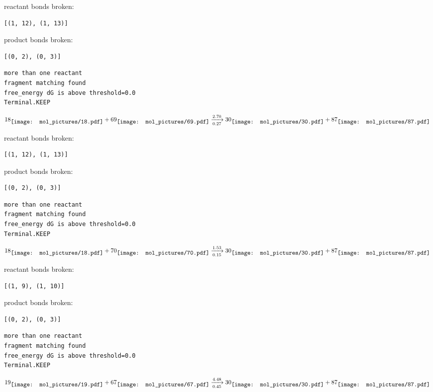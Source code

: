 \documentclass{article}
\begin{document}
reactant bonds broken:\begin{verbatim}
[(1, 12), (1, 13)]
\end{verbatim}
product bonds broken:\begin{verbatim}
[(0, 2), (0, 3)]
\end{verbatim}




\vspace{1cm}
\begin{verbatim}
more than one reactant
fragment matching found
free_energy dG is above threshold=0.0
Terminal.KEEP
\end{verbatim}
$$
18
\raisebox{-.5\height}{\texttt{[image: mol\_pictures/18.pdf]}}
+
69
\raisebox{-.5\height}{\texttt{[image: mol\_pictures/69.pdf]}}
\xrightarrow[0.27]{2.70}
30
\raisebox{-.5\height}{\texttt{[image: mol\_pictures/30.pdf]}}
+
87
\raisebox{-.5\height}{\texttt{[image: mol\_pictures/87.pdf]}}
$$


reactant bonds broken:\begin{verbatim}
[(1, 12), (1, 13)]
\end{verbatim}
product bonds broken:\begin{verbatim}
[(0, 2), (0, 3)]
\end{verbatim}




\vspace{1cm}
\begin{verbatim}
more than one reactant
fragment matching found
free_energy dG is above threshold=0.0
Terminal.KEEP
\end{verbatim}
$$
18
\raisebox{-.5\height}{\texttt{[image: mol\_pictures/18.pdf]}}
+
70
\raisebox{-.5\height}{\texttt{[image: mol\_pictures/70.pdf]}}
\xrightarrow[0.15]{1.53}
30
\raisebox{-.5\height}{\texttt{[image: mol\_pictures/30.pdf]}}
+
87
\raisebox{-.5\height}{\texttt{[image: mol\_pictures/87.pdf]}}
$$


reactant bonds broken:\begin{verbatim}
[(1, 9), (1, 10)]
\end{verbatim}
product bonds broken:\begin{verbatim}
[(0, 2), (0, 3)]
\end{verbatim}




\vspace{1cm}
\begin{verbatim}
more than one reactant
fragment matching found
free_energy dG is above threshold=0.0
Terminal.KEEP
\end{verbatim}
$$
19
\raisebox{-.5\height}{\texttt{[image: mol\_pictures/19.pdf]}}
+
67
\raisebox{-.5\height}{\texttt{[image: mol\_pictures/67.pdf]}}
\xrightarrow[0.45]{4.48}
30
\raisebox{-.5\height}{\texttt{[image: mol\_pictures/30.pdf]}}
+
87
\raisebox{-.5\height}{\texttt{[image: mol\_pictures/87.pdf]}}
$$
\end{document}

